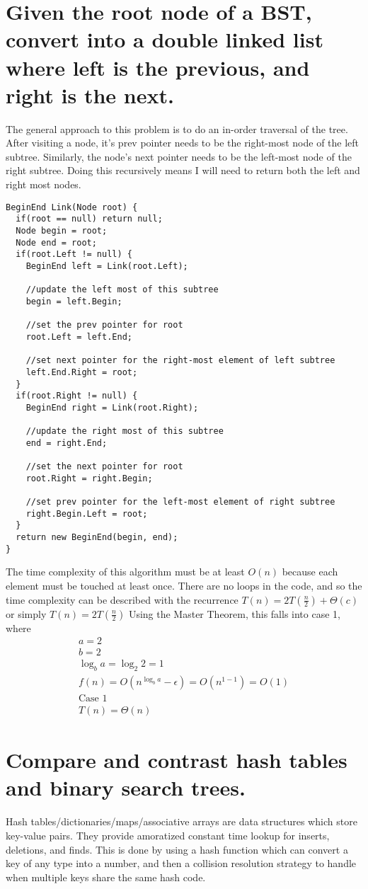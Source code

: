 \documentclass{article}
\begin{document}
\section{Given the root node of a BST, convert into a double linked list where left is the previous, and right is the next.}
The general approach to this problem is to do an in-order traversal of the tree.
After visiting a node, it's prev pointer needs to be the right-most node of the left subtree.
Similarly, the node's next pointer needs to be the left-most node of the right subtree.
Doing this recursively means I will need to return both the left and right most nodes.
\begin{lstlisting}
BeginEnd Link(Node root) {
  if(root == null) return null;
  Node begin = root;
  Node end = root;
  if(root.Left != null) {
    BeginEnd left = Link(root.Left);

    //update the left most of this subtree
    begin = left.Begin; 

    //set the prev pointer for root
    root.Left = left.End; 

    //set next pointer for the right-most element of left subtree
    left.End.Right = root; 
  }
  if(root.Right != null) {
    BeginEnd right = Link(root.Right);

    //update the right most of this subtree
    end = right.End;

    //set the next pointer for root
    root.Right = right.Begin;

    //set prev pointer for the left-most element of right subtree
    right.Begin.Left = root;
  }
  return new BeginEnd(begin, end);
}
\end{lstlisting}
The time complexity of this algorithm must be at least \(O(n)\) because each element must be touched at least once.
There are no loops in the code, and so the time complexity can be described with the recurrence \(T(n) = 2T(\frac{n}{2}) + \Theta(c)\) or simply \(T(n) = 2T(\frac{n}{2})\)
Using the Master Theorem, this falls into case 1, where 
\begin{align*}
    a = 2 \\
    b = 2 \\
    \log_b{a} = \log_2{2} = 1 \\
    f(n) = O(n^{\log_b{a}} - \epsilon) = O(n^{1 - 1}) = O(1) \\
    \text{Case 1} \\
    T(n) = \Theta(n)
\end{align*}

\section{Compare and contrast hash tables and binary search trees.}
Hash tables/dictionaries/maps/associative arrays are data structures which store key-value pairs.
They provide amoratized constant time lookup for inserts, deletions, and finds.
This is done by using a hash function which can convert a key of any type into a number, and then a collision resolution strategy to handle when multiple keys share the same hash code.
\end{document}
